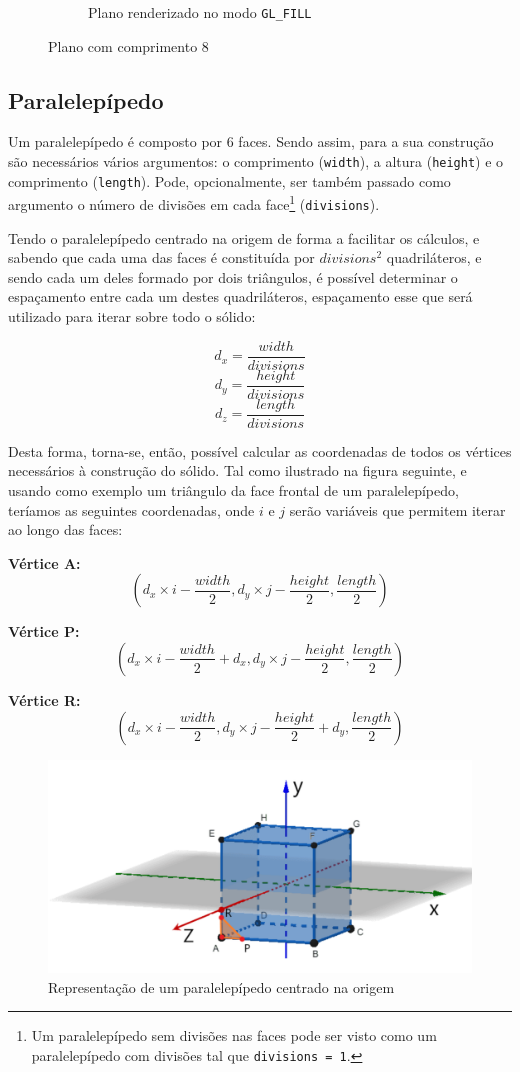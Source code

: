 \documentclass[a4paper, 11pt]{article}
\begin{document}
\begin{figure}[H]
\begin{subfigure}{.5\textwidth}
    \caption{Plano renderizado no modo \texttt{GL\_FILL}}
\end{subfigure}
\caption{Plano com comprimento 8}
\end{figure}

\subsection{Paralelepípedo}

Um paralelepípedo é composto por 6 faces. Sendo assim, para a sua construção são necessários 
vários argumentos: o comprimento (\texttt{width}), a altura (\texttt{height}) e o comprimento
(\texttt{length}). Pode, opcionalmente, ser também passado como argumento o número de divisões em
cada face\footnote{Um paralelepípedo sem divisões nas faces pode ser visto como
um paralelepípedo com divisões tal que \texttt{divisions = 1}.} (\texttt{divisions}).

Tendo o paralelepípedo centrado na origem de forma a facilitar os cálculos, e sabendo que cada 
uma das faces é constituída por $divisions^2$ quadriláteros, e sendo cada um deles formado por dois
triângulos, é possível determinar o espaçamento entre cada um destes quadriláteros, espaçamento
esse que será utilizado para iterar sobre todo o sólido:

$$d_x = \frac{width}{divisions}$$
$$d_y = \frac{height}{divisions}$$
$$d_z = \frac{length}{divisions}$$

Desta forma, torna-se, então, possível calcular as coordenadas de todos os vértices necessários 
à construção do sólido. Tal como ilustrado na figura seguinte, e usando como exemplo um triângulo
da face frontal de um paralelepípedo, teríamos as seguintes coordenadas, onde $i$ e $j$ serão
variáveis que permitem iterar ao longo das faces:

\textbf{Vértice A:} $$\left(d_x\times i - \frac{width}{2}, d_y \times j - \frac{height}{2}, 
\frac{length}{2} \right)$$

\textbf{Vértice P:} $$\left(d_x\times i - \frac{width}{2} + d_x, d_y \times j - \frac{height}{2}, 
\frac{length}{2} \right)$$

\textbf{Vértice R:} $$\left(d_x\times i - \frac{width}{2}, d_y \times j - \frac{height}{2} + d_y, 
\frac{length}{2} \right)$$

\begin{figure}[H]
    \centering
    \includegraphics[width=.6\textwidth]{img/paralelepipedo.png}
    \caption{Representação de um paralelepípedo centrado na origem}
\end{figure}
\end{document}
